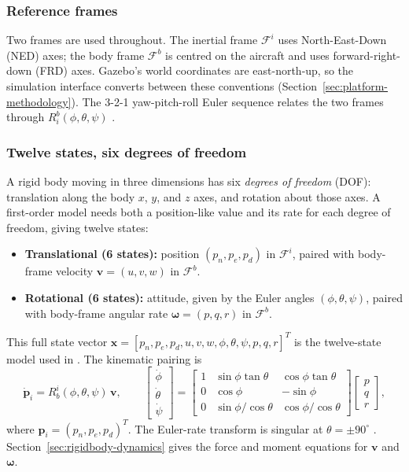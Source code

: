 \documentclass{article}
\begin{document}
\subsubsection{Reference frames}
Two frames are used throughout. The inertial frame $\mathcal{F}^{i}$ uses North-East-Down (NED) axes; the body frame $\mathcal{F}^{b}$ is centred on the aircraft and uses forward-right-down (FRD) axes. Gazebo's world coordinates are east-north-up, so the simulation interface converts between these conventions (Section~\ref{sec:platform-methodology}). The 3-2-1 yaw-pitch-roll Euler sequence relates the two frames through $R^{b}_{i}(\phi,\theta,\psi)$ \citep{beardmclain2012}.

\subsubsection{Twelve states, six degrees of freedom}
\label{sec:twelvestates}
A rigid body moving in three dimensions has six \emph{degrees of freedom} (DOF): translation along the body $x$, $y$, and $z$ axes, and rotation about those axes. A first-order model needs both a position-like value and its rate for each degree of freedom, giving twelve states:
\begin{itemize}
    \item \textbf{Translational (6 states):} position $(p_n,p_e,p_d)$ in $\mathcal{F}^i$, paired with body-frame velocity $\mathbf{v}=(u,v,w)$ in $\mathcal{F}^b$.
    \item \textbf{Rotational (6 states):} attitude, given by the Euler angles $(\phi,\theta,\psi)$, paired with body-frame angular rate $\boldsymbol{\omega}=(p,q,r)$ in $\mathcal{F}^b$.
\end{itemize}
This full state vector $\mathbf{x}=[p_n,p_e,p_d,u,v,w,\phi,\theta,\psi,p,q,r]^{T}$ is the twelve-state model used in \citep{beardmclain2012}. The kinematic pairing is
\begin{equation}
    \dot{\mathbf{p}}_{i}=R^{i}_{b}(\phi,\theta,\psi)\,\mathbf{v},\qquad
    \begin{bmatrix}\dot\phi\\\dot\theta\\\dot\psi\end{bmatrix}
    =\begin{bmatrix}1&\sin\phi\tan\theta&\cos\phi\tan\theta\\0&\cos\phi&-\sin\phi\\0&\sin\phi/\cos\theta&\cos\phi/\cos\theta\end{bmatrix}
    \begin{bmatrix}p\\q\\r\end{bmatrix},
    \label{eq:euler-kinematics}
\end{equation}
where $\mathbf{p}_i=(p_n,p_e,p_d)^T$. The Euler-rate transform is singular at $\theta=\pm90^{\circ}$ \citep{beardmclain2012}. Section~\ref{sec:rigidbody-dynamics} gives the force and moment equations for $\mathbf{v}$ and $\boldsymbol{\omega}$.
\end{document}
